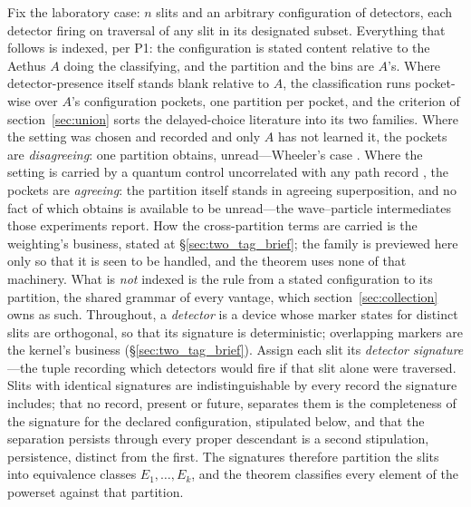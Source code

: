 \documentclass[11pt]{article}
\theoremstyle{definition}
\newcommand{\Aethus}{Aethus}
\begin{document}
Fix the laboratory case: $n$ slits and an arbitrary configuration of detectors, each detector firing on traversal of any slit in its designated subset.
Everything that follows is indexed, per P1: the configuration is stated content relative to the \Aethus{} $A$ doing the classifying, and the partition and the bins are $A$'s. Where detector-presence itself stands blank relative to $A$, the classification runs pocket-wise over $A$'s configuration pockets, one partition per pocket, and the criterion of section~\ref{sec:union} sorts the delayed-choice literature into its two families. Where the setting was chosen and recorded and only $A$ has not learned it, the pockets are \emph{disagreeing}: one partition obtains, unread---Wheeler's case \cite{wheeler1983law}. Where the setting is carried by a quantum control uncorrelated with any path record \cite{ionicioiu2011proposal}, the pockets are \emph{agreeing}: the partition itself stands in agreeing superposition, and no fact of which obtains is available to be unread---the wave--particle intermediates those experiments report. How the cross-partition terms are carried is the weighting's business, stated at \S\ref{sec:two_tag_brief}; the family is previewed here only so that it is seen to be handled, and the theorem uses none of that machinery. What is \emph{not} indexed is the rule from a stated configuration to its partition, the shared grammar of every vantage, which section~\ref{sec:collection} owns as such.
Throughout, a \emph{detector} is a device whose marker states for distinct slits are orthogonal, so that its signature is deterministic; overlapping markers are the kernel's business (\S\ref{sec:two_tag_brief}). Assign each slit its \emph{detector signature}---the tuple recording which detectors would fire if that slit alone were traversed. Slits with identical signatures are indistinguishable by every record the signature includes; that no record, present or future, separates them is the completeness of the signature for the declared configuration, stipulated below, and that the separation persists through every proper descendant is a second stipulation, persistence, distinct from the first. The signatures therefore partition the slits into equivalence classes $E_1, \dots, E_k$, and the theorem classifies every element of the powerset against that partition.
\end{document}
